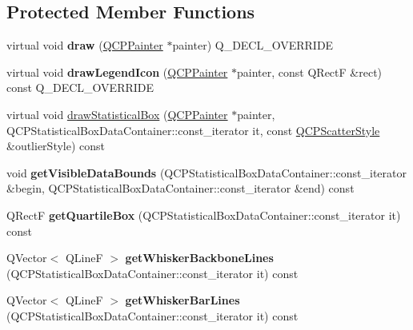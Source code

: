 \subsection*{Protected Member Functions}
\begin{DoxyCompactItemize}
\item 
virtual void {\bfseries draw} (\hyperlink{classQCPPainter}{Q\+C\+P\+Painter} $\ast$painter) Q\+\_\+\+D\+E\+C\+L\+\_\+\+O\+V\+E\+R\+R\+I\+DE\hypertarget{classQCPStatisticalBox_afcff35fa79728cfe10e80e0702014fea}{}\label{classQCPStatisticalBox_afcff35fa79728cfe10e80e0702014fea}

\item 
virtual void {\bfseries draw\+Legend\+Icon} (\hyperlink{classQCPPainter}{Q\+C\+P\+Painter} $\ast$painter, const Q\+RectF \&rect) const Q\+\_\+\+D\+E\+C\+L\+\_\+\+O\+V\+E\+R\+R\+I\+DE\hypertarget{classQCPStatisticalBox_ad286c63a79c21d5231a4b6c6fdbb914f}{}\label{classQCPStatisticalBox_ad286c63a79c21d5231a4b6c6fdbb914f}

\item 
virtual void \hyperlink{classQCPStatisticalBox_a11077e9144b7bd22cc2a109ac6255b6e}{draw\+Statistical\+Box} (\hyperlink{classQCPPainter}{Q\+C\+P\+Painter} $\ast$painter, Q\+C\+P\+Statistical\+Box\+Data\+Container\+::const\+\_\+iterator it, const \hyperlink{classQCPScatterStyle}{Q\+C\+P\+Scatter\+Style} \&outlier\+Style) const 
\item 
void {\bfseries get\+Visible\+Data\+Bounds} (Q\+C\+P\+Statistical\+Box\+Data\+Container\+::const\+\_\+iterator \&begin, Q\+C\+P\+Statistical\+Box\+Data\+Container\+::const\+\_\+iterator \&end) const \hypertarget{classQCPStatisticalBox_a13c6eaa963579b5a5c5f05c560e447ab}{}\label{classQCPStatisticalBox_a13c6eaa963579b5a5c5f05c560e447ab}

\item 
Q\+RectF {\bfseries get\+Quartile\+Box} (Q\+C\+P\+Statistical\+Box\+Data\+Container\+::const\+\_\+iterator it) const \hypertarget{classQCPStatisticalBox_af7fea1fd0b342ae6ecb228c5d4edd765}{}\label{classQCPStatisticalBox_af7fea1fd0b342ae6ecb228c5d4edd765}

\item 
Q\+Vector$<$ Q\+LineF $>$ {\bfseries get\+Whisker\+Backbone\+Lines} (Q\+C\+P\+Statistical\+Box\+Data\+Container\+::const\+\_\+iterator it) const \hypertarget{classQCPStatisticalBox_ace6152baecc4376dafbc5192e3bab20f}{}\label{classQCPStatisticalBox_ace6152baecc4376dafbc5192e3bab20f}

\item 
Q\+Vector$<$ Q\+LineF $>$ {\bfseries get\+Whisker\+Bar\+Lines} (Q\+C\+P\+Statistical\+Box\+Data\+Container\+::const\+\_\+iterator it) const \hypertarget{classQCPStatisticalBox_a7d1d9d9cbffba6fa9c37d3051b9d80c7}{}\label{classQCPStatisticalBox_a7d1d9d9cbffba6fa9c37d3051b9d80c7}

\end{DoxyCompactItemize}
